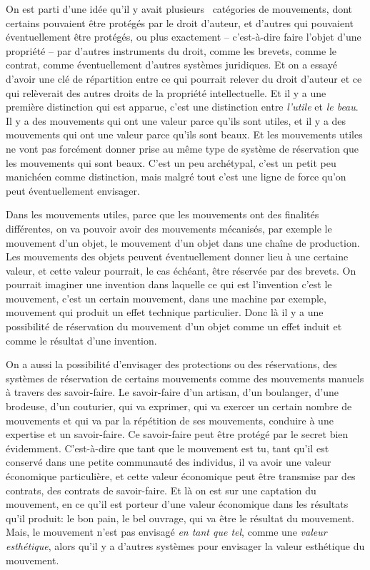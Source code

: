 {On est parti d'une id\'ee qu'il y avait
plusieurs \ cat\'egories de mouvements, dont certains pouvaient \^etre
prot\'eg\'es par le droit d'auteur, et d'autres qui pouvaient
\'eventuellement \^etre prot\'eg\'es, ou plus exactement 
{--} c'est{}-\`a{}-dire faire l'objet d'une propri\'et\'e {--} par
d'autres instruments du droit, comme les brevets, comme le contrat,
comme \'eventuellement d'autres syst\`emes juridiques. Et on a essay\'e
d'avoir une cl\'e de r\'epartition entre ce qui pourrait relever du
droit d'auteur et ce qui rel\`everait des autres droits de la
propri\'et\'e intellectuelle. Et il y a une premi\`ere distinction qui
est apparue, c'est une distinction entre {\em l'utile} et {\em le
beau}. Il y a des mouvements qui ont une valeur parce qu'ils sont
utiles, et il y a des mouvements qui ont une valeur parce qu'ils sont
beaux. Et les mouvements utiles ne vont pas forc\'ement donner prise au
m\^eme type de syst\`eme de r\'eservation que les mouvements qui sont
beaux. C'est un peu arch\'etypal, c'est un petit peu manich\'een comme
distinction, mais malgr\'e tout c'est une ligne de force qu'on peut
\'eventuellement envisager.\par

Dans les mouvements utiles, parce que les mouvements ont des finalit\'es
diff\'erentes, on va pouvoir avoir des mouvements m\'ecanis\'es, par
exemple le mouvement d'un objet, le mouvement d'un objet dans une
cha\^ine de production. Les mouvements des objets peuvent
\'eventuellement donner lieu \`a une certaine valeur, et cette valeur
pourrait, le cas \'ech\'eant, \^etre r\'eserv\'ee par des brevets. On
pourrait imaginer une invention dans laquelle ce qui est l'invention
c'est le mouvement, c'est un certain mouvement, dans une machine par
exemple, mouvement qui produit un effet technique particulier. Donc
l\`a il y a une possibilit\'e de r\'eservation du mouvement d'un objet
comme un effet induit et comme le r\'esultat d'une invention.\par

On a aussi la possibilit\'e d'envisager des protections ou des
r\'eservations, des syst\`emes de r\'eservation de certains mouvements
comme des mouvements manuels \`a travers des savoir{}-faire. Le
savoir{}-faire d'un artisan, d'un boulanger, d'une brodeuse, d'un
couturier, qui va exprimer, qui va exercer un certain nombre de
mouvements et qui va par la r\'ep\'etition de ses mouvements, conduire
\`a une expertise et un savoir{}-faire. Ce savoir{}-faire peut \^etre
prot\'eg\'e par le secret bien \'evidemment. C'est{}-\`a{}-dire que
tant que le mouvement est tu, tant qu'il est conserv\'e dans une petite
communaut\'e des individus, il va avoir une valeur \'economique
particuli\`ere, et cette valeur \'economique peut \^etre transmise par
des contrats, des contrats de savoir{}-faire. Et l\`a on est sur une
captation du mouvement, en ce qu'il est porteur d'une valeur
\'economique dans les r\'esultats qu'il produit: le bon pain, le bel
ouvrage, qui va \^etre le r\'esultat du mouvement. Mais, le mouvement
n'est pas envisag\'e {\em en tant que tel}, comme une {\em valeur
esth\'etique}, alors qu'il y a d'autres syst\`emes pour envisager la
valeur esth\'etique du mouvement.\par

}
